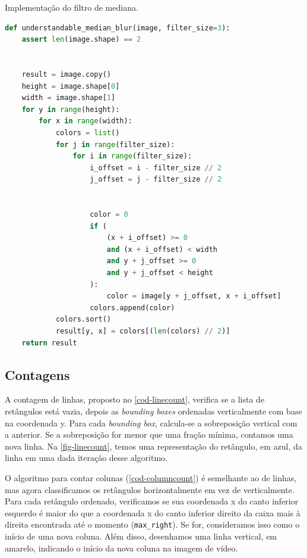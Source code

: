 \documentclass[english, 
               brazil, 
               bsc] %
               {dcomp-abntex2}
\begin{document}
\begin{codigo}[h]
  \caption{\small Implementação do filtro de mediana.}
 \label{cod-mediana}
\begin{lstlisting}[language=python]
def understandable_median_blur(image, filter_size=3):
    assert len(image.shape) == 2


    result = image.copy()
    height = image.shape[0]
    width = image.shape[1]
    for y in range(height):
        for x in range(width):
            colors = list()
            for j in range(filter_size):
                for i in range(filter_size):
                    i_offset = i - filter_size // 2
                    j_offset = j - filter_size // 2


                    color = 0
                    if (
                        (x + i_offset) >= 0
                        and (x + i_offset) < width
                        and y + j_offset >= 0
                        and y + j_offset < height
                    ):
                        color = image[y + j_offset, x + i_offset]
                    colors.append(color)
            colors.sort()
            result[y, x] = colors[(len(colors) // 2)]
    return result
\end{lstlisting}
\end{codigo}


\subsection{Contagens} \label{sec-contagem}


A contagem de linhas, proposto no \autoref{cod-linecount}, verifica se a lista de retângulos está vazia, depois as \textit{bounding boxes} ordenadas verticalmente com base na coordenada y. Para cada \textit{bounding box}, calcula-se a sobreposição vertical com a anterior. Se a sobreposição for menor que uma fração mínima, contamos uma nova linha. Na \autoref{fig-linecount}, temos uma representação do retângulo, em azul, da linha em uma dada iteração desse algoritmo.


O algoritmo para contar colunas (\autoref{cod-columncount}) é semelhante ao de linhas, mas agora classificamos os retângulos horizontalmente em vez de verticalmente. Para cada retângulo ordenado, verificamos se sua coordenada x do canto inferior esquerdo é maior do que a coordenada x do canto inferior direito da caixa mais à direita encontrada até o momento (\texttt{max\_right}). Se for, consideramos isso como o início de uma nova coluna. Além disso, desenhamos uma linha vertical, em amarelo, indicando o início da nova coluna na imagem de vídeo.
\end{document}
